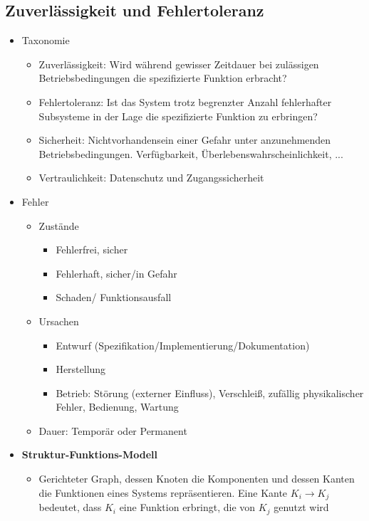 \subsection{Zuverlässigkeit und Fehlertoleranz}
\begin{itemize}
	\item Taxonomie
	\begin{itemize}
		\item Zuverlässigkeit: Wird während gewisser Zeitdauer bei zulässigen Betriebsbedingungen die spezifizierte Funktion erbracht?
		\item Fehlertoleranz: Ist das System trotz begrenzter Anzahl fehlerhafter Subsysteme in der Lage die spezifizierte Funktion zu erbringen?
		\item Sicherheit: Nichtvorhandensein einer Gefahr unter anzunehmenden Betriebsbedingungen. Verfügbarkeit, Überlebenswahrscheinlichkeit, ...
		\item Vertraulichkeit: Datenschutz und Zugangssicherheit
	\end{itemize}
	\item Fehler
	\begin{itemize}
		\item Zustände
		\begin{itemize}
			\item Fehlerfrei, sicher
			\item Fehlerhaft, sicher/in Gefahr
			\item Schaden/ Funktionsausfall
		\end{itemize}
		\item Ursachen
		\begin{itemize}
			\item Entwurf (Spezifikation/Implementierung/Dokumentation)
			\item Herstellung
			\item Betrieb: Störung (externer Einfluss), Verschleiß, zufällig physikalischer Fehler, Bedienung,  Wartung
		\end{itemize}
		\item Dauer: Temporär oder Permanent
	\end{itemize}
	\item \textbf{Struktur-Funktions-Modell}
	\begin{itemize}
		\item Gerichteter Graph, dessen Knoten die Komponenten und dessen Kanten die Funktionen eines Systems repräsentieren. Eine Kante \(K_i \longrightarrow K_j\) bedeutet, dass \(K_i\) eine Funktion erbringt, die von \(K_j\) genutzt wird

\end{itemize}
\end{itemize}
